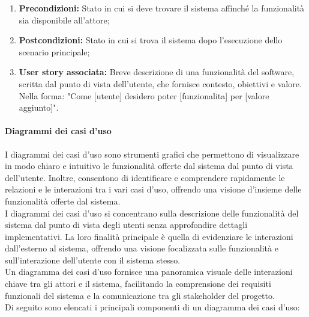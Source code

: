 \begin{enumerate}
    \item \textbf{Precondizioni:} Stato in cui si deve trovare il sistema affinché la funzionalità sia disponibile all'attore;
    \item \textbf{Postcondizioni:} Stato in cui si trova il sistema dopo l'esecuzione dello scenario principale;
    \item \textbf{User story associata:} Breve descrizione di una funzionalità del software, scritta dal punto di vista dell'utente, che fornisce contesto, obiettivi e valore. \\
    Nella forma: "Come [utente] desidero poter [funzionalita] per [valore aggiunto]".
\end{enumerate}

\paragraph{Diagrammi dei casi d'uso} 
I diagrammi dei casi d'uso sono strumenti grafici che permettono di visualizzare in modo chiaro e intuitivo le funzionalità offerte dal sistema dal punto di vista dell'utente. Inoltre, consentono di identificare e comprendere rapidamente le relazioni e le interazioni tra i vari casi d'uso, offrendo una visione d'insieme delle funzionalità offerte dal sistema.\\
I diagrammi dei casi d'uso si concentrano sulla descrizione delle funzionalità del sistema dal punto di vista degli utenti senza approfondire dettagli implementativi. La loro finalità principale è quella di evidenziare le interazioni dall'esterno al sistema, offrendo una visione focalizzata sulle funzionalità e sull'interazione dell'utente con il sistema stesso. \\
Un diagramma dei casi d'uso fornisce una panoramica visuale delle interazioni chiave tra gli attori e il sistema, facilitando la comprensione dei requisiti funzionali del sistema e la comunicazione tra gli stakeholder del progetto. \\
Di seguito sono elencati i principali componenti di un diagramma dei casi d'uso:

